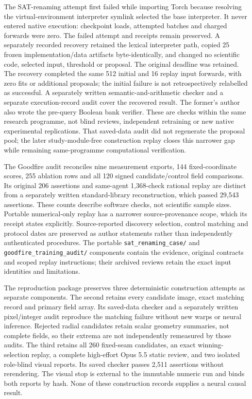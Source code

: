 \documentclass[
  british,
  11pt,
  a4paper,
]{article}
\begin{document}
The SAT-renaming attempt first failed while importing Torch because
resolving the virtual-environment interpreter symlink selected the base
interpreter. It never entered native execution: checkpoint loads,
attempted batches and charged forwards were zero. The failed attempt and
receipts remain preserved. A separately recorded recovery retained the
lexical interpreter path, copied 25 frozen implementation/data artifacts
byte-identically, and changed no scientific code, selected input,
threshold or proposal. The original deadline was retained. The recovery
completed the same 512 initial and 16 replay input forwards, with zero
fits or additional proposals; the initial failure is not retrospectively
relabelled as successful. A separately written semantic-and-arithmetic
checker and a separate execution-record audit cover the recovered
result. The former's author also wrote the pre-query Boolean bank
verifier. These are checks within the same research programme, not blind
reviews, independent retraining or new native experimental replications.
That saved-data audit did not regenerate the proposal pool; the later
study-module-free construction replay closes this narrower gap while
remaining same-programme computational verification.

The Goodfire audit reconciles nine measurement exports, 144
fixed-coordinate scores, 255 ablation rows and all 120 signed
candidate/control field comparisons. Its original 206 assertions and
same-agent 1,368-check rational replay are distinct from a separately
written standard-library reconstruction, which passed 29,543 assertions.
These counts describe software checks, not scientific sample sizes.
Portable numerical-only replay has a narrower source-provenance scope,
which its receipt states explicitly. Source-reported discovery
selection, control matching and protocol dates are preserved as author
statements rather than independently authenticated procedures. The
portable \texttt{sat\_renaming\_case/} and
\texttt{goodfire\_training\_audit/} components contain the evidence,
original contracts and scoped replay instructions; their archived
reviews retain the exact input identities and limitations.

The reproduction package preserves three deterministic construction
attempts as separate components. The second retains every candidate
image, exact matching record and primary field array. Its saved-data
checker and a separately written pixel/integer audit reproduce the
matching failure without new warps or neural inference. Rejected radial
candidates retain scalar geometry summaries, not complete fields, so
their extrema are not independently remeasured by those audits. The
third retains all 260 fixed-seam candidates, an exact winning-selection
replay, a complete high-effort Opus 5.5 static review, and two isolated
role-blind visual reports. Its saved checker passes 2,511 assertions
without rerendering. The visual stop is external to the immutable
numeric run and binds both reports by hash. None of these construction
records supplies a neural causal result.
\end{document}
